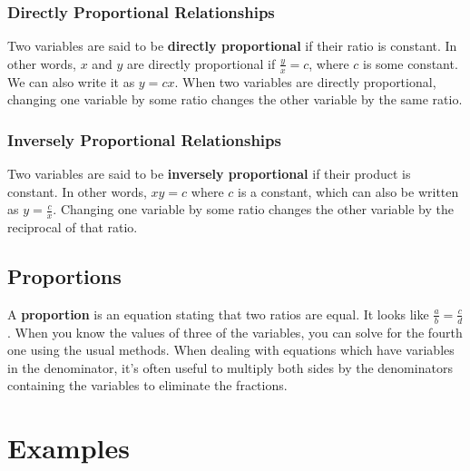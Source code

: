 \documentclass{article}
\begin{document}
    \subsubsection*{Directly Proportional Relationships}
    Two variables are said to be \textbf{directly proportional} if their ratio
    is constant. In other words, $x$ and $y$ are directly proportional if
    $\frac{y}{x} = c$, where $c$ is some constant. We can also write it as $y =
    cx$. When two variables are directly proportional, changing one variable by
    some ratio changes the other variable by the same ratio.
    \subsubsection*{Inversely Proportional Relationships}
    Two variables are said to be \textbf{inversely proportional} if their
    product is constant. In other words, $xy = c$ where $c$ is a constant, which
    can also be written as $y = \frac{c}{x}$. Changing one variable by some
    ratio changes the other variable by the reciprocal of that ratio.
    \subsection*{Proportions}
    A \textbf{proportion} is an equation stating that two ratios are equal. It
    looks like $\frac{a}{b} = \frac{c}{d}$. When you know the values of three of
    the variables, you can solve for the fourth one using the usual methods.
    When dealing with equations which have variables in the denominator, it's
    often useful to multiply both sides by the denominators containing the
    variables to eliminate the fractions.
    \section*{Examples}
\end{document}
